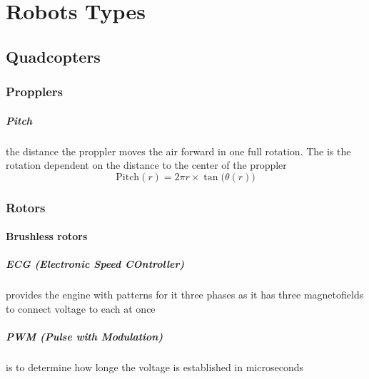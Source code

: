 \chapter{Robots Types}
\section{Quadcopters}
    \subsection{Propplers}
        \paragraph{Pitch}
            the distance the proppler moves the air forward in one full rotation.
            The \theta is the rotation dependent on the distance to the center of the proppler
            \[
            \text{Pitch}(r) = 2\pi r \times \tan\big(\theta(r)\big)
            \]
    \subsection{Rotors}
        
        \subsubsection{Brushless rotors}
            \paragraph{ECG (Electronic Speed COntroller)}
                provides the engine with patterns for it three phases as it has three magnetofields to connect voltage to each at once
            \paragraph{PWM (Pulse with Modulation)}
                is to determine how longe the voltage is established in microseconds
